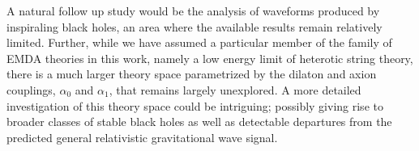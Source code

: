 A natural follow up study would be the analysis of waveforms produced by inspiraling black holes, an area where the available results remain relatively limited. Further, while we have assumed a particular member of the family of EMDA theories in this work, namely a low energy limit of heterotic string theory, there is a much larger theory space parametrized by the dilaton and axion couplings, $\alpha_0$ and $\alpha_1$, that remains largely unexplored. A more detailed investigation of this theory space could be intriguing; possibly giving rise to broader classes of stable black holes as well as detectable departures from the predicted general relativistic gravitational wave signal.  
 




